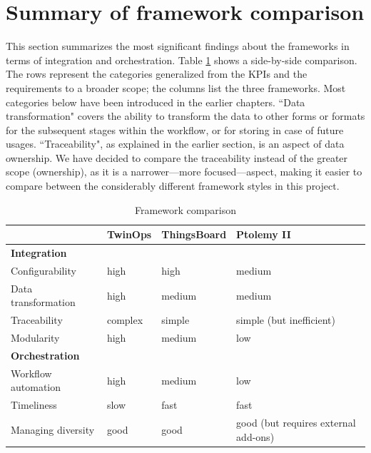 \section{Summary of framework comparison}
This section summarizes the most significant findings about the frameworks in terms of integration and orchestration. Table \ref{tab:framecompare} shows a side-by-side comparison. The rows represent the categories generalized from the KPIs and the requirements to a broader scope; the columns list the three frameworks. Most categories below have been introduced in the earlier chapters. ``Data transformation" covers the ability to transform the data to other forms or formats for the subsequent stages within the workflow, or for storing in case of future usages. ``Traceability", as explained in the earlier section, is an aspect of data ownership. We have decided to compare the traceability instead of the greater scope (ownership), as it is a narrower---more focused---aspect, making it easier to compare between the considerably different framework styles in this project.
 
\begin{table}[hbt!]
\centering
\begin{tabularx}{\textwidth}{|X|p{3cm}|p{3cm}|p{3cm}|}
\hline
 & \textbf{TwinOps} & \textbf{ThingsBoard} &  \textbf{Ptolemy II}\\ \hline    
\multicolumn{1}{|l|}{\textbf{Integration}} & \multicolumn{3}{c|}{}\\ \hline           
{Configurability} & high & high & medium \\ \hline
{Data transformation} & high & medium & medium \\ \hline
{Traceability} & complex & simple &  simple (but inefficient) \\ \hline
{Modularity} & high & medium & low \\ \hline   
\multicolumn{1}{|l|}{\textbf{Orchestration}} & \multicolumn{3}{c|}{}\\ \hline  
{Workflow automation} & high & medium & low\\ \hline
{Timeliness} & slow & fast & fast\\ \hline
{Managing diversity} & good & good & good (but requires external add-ons) \\ \hline 
\end{tabularx}
\caption{Framework comparison}
\label{tab:framecompare}
\end{table} 
 
